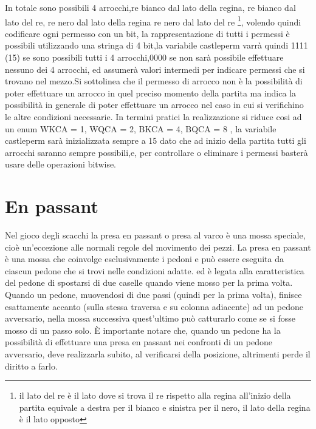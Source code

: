 In totale sono possibili 4 arrocchi,re bianco dal lato della regina, re bianco dal lato del re, re nero dal lato della regina
re  nero dal lato del re \footnote{il lato del re è il lato dove si  trova il re rispetto alla regina all'inizio della partita
    equivale a destra per il bianco e sinistra per il nero, il lato della regina è il lato opposto},
volendo quindi codificare ogni permesso con un bit, la rappresentazione di tutti  i permessi è possibili utilizzando
una stringa di 4 bit,la variabile castleperm varrà quindi 1111 (15) se sono possibili tutti i 4  arrocchi,0000 se non sarà  possibile
effettuare nessuno dei 4 arrocchi, ed assumerà valori intermedi per indicare permessi che si trovano nel mezzo.\newline Si sottolinea che il permesso di arrocco
non è la possibilità di poter effettuare un arrocco in quel preciso momento della partita ma indica la possibilità in generale di poter effettuare un arrocco
nel caso in cui si verifichino le altre condizioni necessarie.\newline
In termini pratici la realizzazione si riduce cosi ad un enum { WKCA = 1, WQCA = 2, BKCA = 4, BQCA = 8 },
la variabile castleperm sarà inizializzata sempre a 15 dato che ad inizio della partita tutti gli arrocchi saranno sempre possibili,e,
per controllare o eliminare i permessi basterà usare delle operazioni bitwise.



\section{En passant}
\label{enpassant}
Nel gioco degli scacchi la presa en passant o presa al varco è una mossa speciale, cioè un'eccezione alle normali regole del movimento dei pezzi.
La presa en passant  è una mossa che coinvolge esclusivamente i pedoni e può essere eseguita da ciascun pedone che si trovi nelle condizioni adatte.
ed è legata alla caratteristica del pedone di spostarsi di due caselle quando viene mosso per la prima volta.
Quando un pedone, muovendosi di due passi (quindi per la prima volta), finisce esattamente accanto (sulla stessa traversa e su colonna adiacente) ad un pedone avversario,
nella mossa successiva quest'ultimo può catturarlo come se si fosse mosso di un passo solo.
È importante notare che, quando un pedone ha la possibilità di effettuare una presa en passant nei confronti di un pedone avversario, deve realizzarla subito, al verificarsi della posizione,
altrimenti perde il diritto a farlo.

